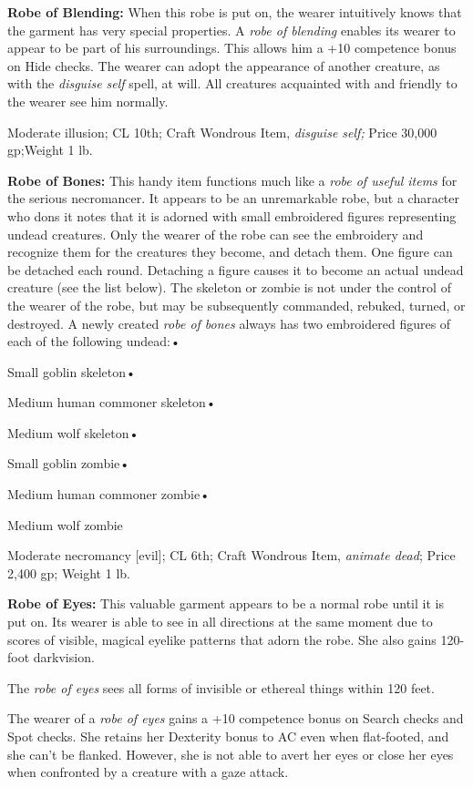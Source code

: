 \textbf{Robe of Blending:} When this robe is put on, the wearer intuitively knows 
that the garment has very special properties. A \textit{robe of blending }enables 
its wearer to appear to be part of his surroundings. This allows him a +10 competence 
bonus on Hide checks. The wearer can adopt the appearance of another creature, 
as with the \textit{disguise self }spell, at will. All creatures acquainted with 
and friendly to the wearer see him normally.

Moderate illusion; CL 10th; Craft Wondrous Item, \textit{disguise self; }Price 
30,000 gp;Weight 1 lb.

\textbf{Robe of Bones:} This handy item functions much like a \textit{robe of useful 
items }for the serious necromancer. It appears to be an unremarkable robe, but 
a character who dons it notes that it is adorned with small embroidered figures 
representing undead creatures. Only the wearer of the robe can see the embroidery 
and recognize them for the creatures they become, and detach them. One figure can 
be detached each round. Detaching a figure causes it to become an actual undead 
creature (see the list below). The skeleton or zombie is not under the control 
of the wearer of the robe, but may be subsequently commanded, rebuked, turned, 
or destroyed. A newly created \textit{robe of bones }always has two embroidered 
figures of each of the following undead:•

Small goblin skeleton•

Medium human commoner skeleton•

Medium wolf skeleton•

Small goblin zombie•

Medium human commoner zombie•

Medium wolf zombie

Moderate necromancy [evil]; CL 6th; Craft Wondrous Item, \textit{animate dead}; 
Price 2,400 gp; Weight 1 lb.

\textbf{Robe of Eyes:} This valuable garment appears to be a normal robe until 
it is put on. Its wearer is able to see in all directions at the same moment due 
to scores of visible, magical eyelike patterns that adorn the robe. She also gains 
120-foot darkvision.

The \textit{robe of eyes }sees all forms of invisible or ethereal things within 
120 feet.

The wearer of a \textit{robe of eyes }gains a +10 competence bonus on Search checks 
and Spot checks. She retains her Dexterity bonus to AC even when flat-footed, and 
she can't be flanked. However, she is not able to avert her eyes or close her eyes 
when confronted by a creature with a gaze attack.

